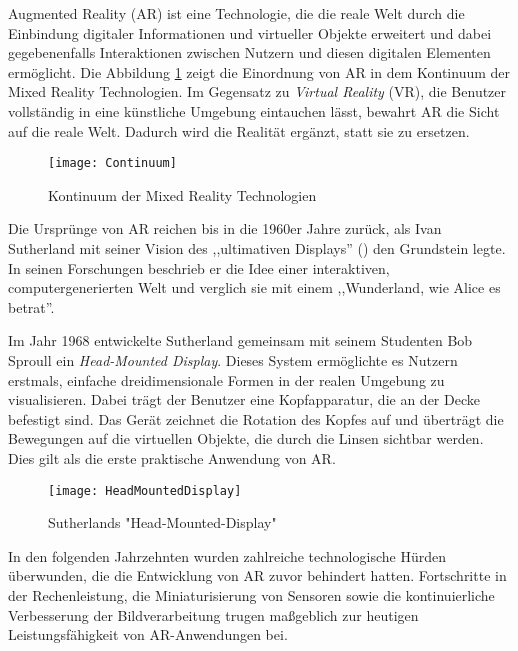 Augmented Reality (AR) ist eine Technologie, die die reale Welt durch die Einbindung digitaler Informationen und virtueller Objekte erweitert und dabei gegebenenfalls Interaktionen zwischen Nutzern und diesen digitalen Elementen ermöglicht. Die Abbildung \ref{fig:Continuum} zeigt die Einordnung von AR in dem Kontinuum der Mixed Reality Technologien. Im Gegensatz zu \emph{Virtual Reality} (VR), die Benutzer vollständig in eine künstliche Umgebung eintauchen lässt, bewahrt AR die Sicht auf die reale Welt. Dadurch wird die Realität ergänzt, statt sie zu ersetzen. \cite{azuma1997ar, doerner2022virtual}

\begin{figure}
    \centering
    \texttt{[image: Continuum]}
    \caption{Kontinuum der Mixed Reality Technologien\label{fig:Continuum}}\par
\end{figure}

Die Ursprünge von AR reichen bis in die 1960er Jahre zurück, als Ivan Sutherland mit seiner Vision des ,,ultimativen Displays'' (\citet{sutherland1965ultimateDisplay}) den Grundstein legte. In seinen Forschungen beschrieb er die Idee einer interaktiven, computergenerierten Welt und verglich sie mit einem ,,Wunderland, wie Alice es betrat''. 

Im Jahr 1968 entwickelte Sutherland gemeinsam mit seinem Studenten Bob Sproull ein \textit{Head-Mounted Display}. Dieses System ermöglichte es Nutzern erstmals, einfache dreidimensionale Formen in der realen Umgebung zu visualisieren. Dabei trägt der Benutzer eine Kopfapparatur, die an der Decke befestigt sind. Das Gerät zeichnet die Rotation des Kopfes auf und überträgt die Bewegungen auf die virtuellen Objekte, die durch die Linsen sichtbar werden. Dies gilt als die erste praktische Anwendung von AR. \cite{sutherland19683dDisplay, doerner2022virtual}

\begin{figure}
    \centering
    \texttt{[image: HeadMountedDisplay]}
    \caption{Sutherlands "Head-Mounted-Display" \cite{sutherland1965ultimateDisplay}\label{fig:HeadMountedDisplay}}\par
\end{figure}

In den folgenden Jahrzehnten wurden zahlreiche technologische Hürden überwunden, die die Entwicklung von AR zuvor behindert hatten. Fortschritte in der Rechenleistung, die Miniaturisierung von Sensoren sowie die kontinuierliche Verbesserung der Bildverarbeitung trugen maßgeblich zur heutigen Leistungsfähigkeit von AR-Anwendungen bei. \cite{doerner2022virtual}

